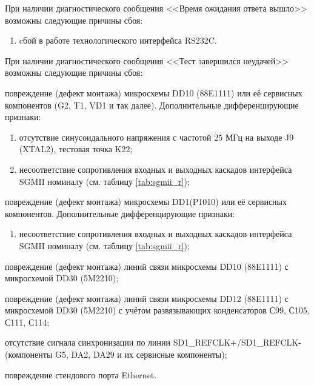     \subpoint При наличии диагностического сообщения <<Время ожидания ответа вышло>> возможны следующие причины сбоя:
      \begin{enumerate}
	\item cбой в работе технологического интерфейса RS232C.
      \end{enumerate}
      
    \label{defects:fault_teth}
    \subpoint При наличии диагностического сообщения <<Тест завершился неудачей>> возможны следующие причины сбоя:      
      \begin{enumerate}\begin{sloppypar}
	\item повреждение (дефект монтажа) микросхемы DD10 (88E1111) или её сервисных компонентов (G2, T1, VD1 и так далее). Дополнительные дифференцирующие признаки:
	  \begin{enumerate}
	    \item отсутствие синусоидального напряжения с частотой 25 МГц на выходе J9 (XTAL2), тестовая точка K22;
	    \item несоответствие сопротивления входных и выходных каскадов интерфейса SGMII номиналу (см. таблицу \ref{tab:sgmii_r});
	  \end{enumerate}
	  
	  
	\item повреждение (дефект монтажа) микросхемы DD1(P1010) или её сервисных компонентов. Дополнительные дифференцирующие признаки:
	  \begin{enumerate}	  
	    \item несоответствие сопротивления входных и выходных каскадов интерфейса SGMII номиналу (см. таблицу \ref{tab:sgmii_r});    
	  \end{enumerate}	  
	\item повреждение (дефект монтажа) линий связи микросхемы DD10 (88E1111) с микросхемой DD30 (5M2210);
	\item повреждение (дефект монтажа) линий связи микросхемы DD12 (88E1111) с микросхемой DD30 (5M2210) с учётом развязывающих конденсаторов С99, С105, С111, С114;
	\item отсутствие сигнала синхронизации по линии SD1\_REFCLK+/SD1\_REFCLK- (компоненты G5, DA2, DA29 и их сервисные компоненты);
	\item повреждение стендового порта Ethernet.
      \end{sloppypar}\end{enumerate}
      
